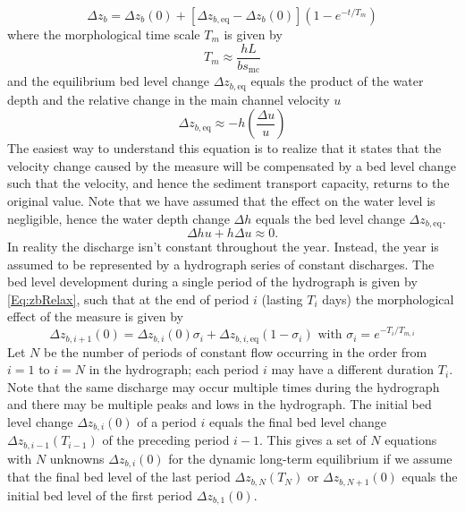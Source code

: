 %
\begin{equation}
\Delta z_b = \Delta z_b (0) + [\Delta z_{b,\text{eq}} - \Delta z_b(0)](1 - e^{-t/T_m})
\label{Eq:zbRelax}
\end{equation}
%
where the morphological time scale $T_m$ is given by
%
\begin{equation}
T_m \approx \frac{h L}{b s_\text{mc}}
\label{Eq:MorTimeScale}
\end{equation}
%
and the equilibrium bed level change $\Delta z_{b,\text{eq}}$ equals the product of the water depth and the relative change in the main channel velocity $u$ 
%
\begin{equation}
\Delta z_{b,\text{eq}} \approx -h \left ( \frac{\Delta u}{u} \right )
\label{Eq:zbEqui}
\end{equation}
%
The easiest way to understand this equation is to realize that it states that the velocity change caused by the measure will be compensated by a bed level change such that the velocity, and hence the sediment transport capacity, returns to the original value.
Note that we have assumed that the effect on the water level is negligible, hence the water depth change $\Delta h$ equals the bed level change $\Delta z_{b,\text{eq}}$.
%
\begin{equation}
\Delta h u + h \Delta u \approx 0.
\label{Eq:zbEqui2}
\end{equation}
%
In reality the discharge isn't constant throughout the year.
Instead, the year is assumed to be represented by a hydrograph series of constant discharges.
The bed level development during a single period of the hydrograph is given by \autoref{Eq:zbRelax}, such that at the end of period $i$ (lasting $T_i$ days) the morphological effect of the measure is given by
%
\begin{equation}
\Delta z_{b,i+1}(0) = \Delta z_{b,i} (0) \sigma_i + \Delta z_{b,i,\text{eq}} (1-\sigma_i) \text{ with } \sigma_i = e^{-T_i/T_{m,i}}
\label{Eq:zbOverTime}
\end{equation}
%
Let $N$ be the number of periods of constant flow occurring in the order from $i=1$ to $i=N$ in the hydrograph; each period $i$ may have a different duration $T_i$.
Note that the same discharge may occur multiple times during the hydrograph and there may be multiple peaks and lows in the hydrograph.
The initial bed level change $\Delta z_{b,i}(0)$ of a period $i$ equals the final bed level change $\Delta z_{b,i-1}(T_{i-1})$ of the preceding period $i-1$.
This gives a set of $N$ equations with $N$ unknowns $\Delta z_{b,i}(0)$ for the dynamic long-term equilibrium if we assume that the final bed level of the last period $\Delta z_{b,N}(T_N)$ or $\Delta z_{b,N+1}(0)$ equals the initial bed level of the first period $\Delta z_{b,1}(0)$.
